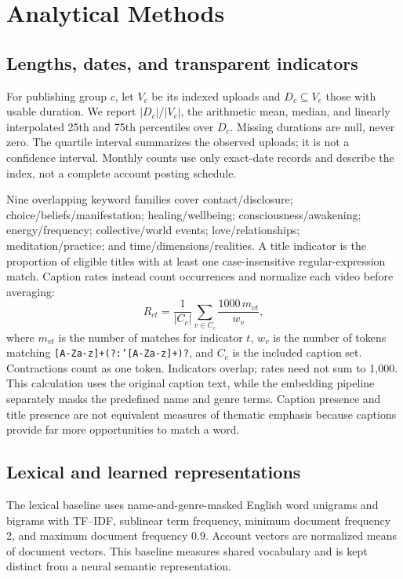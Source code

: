 \section{Analytical Methods}
\subsection{Lengths, dates, and transparent indicators}
For publishing group $c$, let $V_c$ be its indexed uploads and $D_c\subseteq V_c$ those with usable duration. We report $|D_c|/|V_c|$, the arithmetic mean, median, and linearly interpolated 25th and 75th percentiles over $D_c$. Missing durations are null, never zero. The quartile interval summarizes the observed uploads; it is not a confidence interval. Monthly counts use only exact-date records and describe the index, not a complete account posting schedule.

Nine overlapping keyword families cover contact/disclosure; choice/beliefs/manifestation; healing/wellbeing; consciousness/awakening; energy/frequency; collective/world events; love/relationships; meditation/practice; and time/dimensions/realities. A title indicator is the proportion of eligible titles with at least one case-insensitive regular-expression match. Caption rates instead count occurrences and normalize each video before averaging:
\begin{equation}
 R_{ct}=\frac{1}{|C_c|}\sum_{v\in C_c}\frac{1000\,m_{vt}}{w_v},
\end{equation}
where $m_{vt}$ is the number of matches for indicator $t$, $w_v$ is the number of tokens matching \texttt{[A-Za-z]+(?:'[A-Za-z]+)?}, and $C_c$ is the included caption set. Contractions count as one token. Indicators overlap; rates need not sum to 1,000. This calculation uses the original caption text, while the embedding pipeline separately masks the predefined name and genre terms. Caption presence and title presence are not equivalent measures of thematic emphasis because captions provide far more opportunities to match a word.

\subsection{Lexical and learned representations}
The lexical baseline uses name-and-genre-masked English word unigrams and bigrams with TF--IDF, sublinear term frequency, minimum document frequency 2, and maximum document frequency 0.9. Account vectors are normalized means of document vectors. This baseline measures shared vocabulary and is kept distinct from a neural semantic representation.

